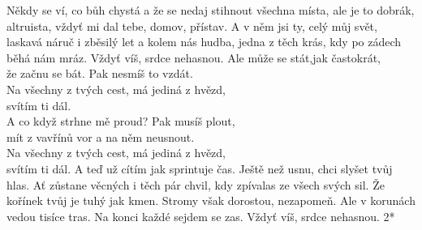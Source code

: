 \ve{}
Někdy se ví, co bůh chystá
a že se nedaj stihnout všechna místa,
ale je to dobrák, altruista,
vždyť mi dal tebe, domov, přístav.
\ve{}
A v něm jsi ty, celý můj svět,
laskavá náruč i zběsilý let
a kolem nás hudba, jedna z těch krás,
kdy po zádech běhá nám mráz.
Vždyť víš, srdce nehasnou.
\cho{}
Ale může se stát,jak častokrát,\\
že začnu se bát.
Pak nesmíš to vzdát.\\
Na všechny z tvých cest,
má jediná z hvězd,\\
svítím ti dál.\\
A co když strhne mě proud?
Pak musíš plout,\\
mít z vavřínů vor
a na něm neusnout.\\
Na všechny z tvých cest,
má jediná z hvězd,\\
svítím ti dál.
\ve{}
A teď už cítím jak sprintuje čas.
Ještě než usnu, chci slyšet tvůj hlas.
Ať zůstane věcných i těch pár chvil,
kdy zpívalas ze všech svých sil.
\ve{}
Že kořínek tvůj je tuhý jak kmen.
Stromy však dorostou, nezapomeň.
Ale v korunách vedou tisíce tras.
Na konci každé sejdem se zas.
Vždyť víš, srdce nehasnou.
\cho{}
2*
\esong